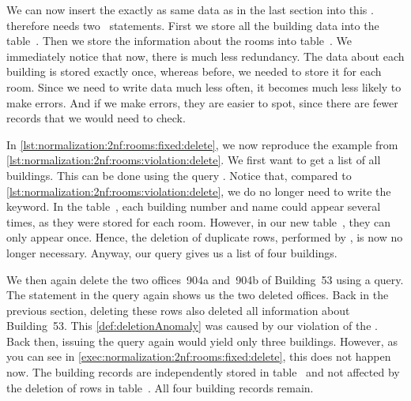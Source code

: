 We can now insert the exactly as same data as in the last section into this \db.
 therefore needs two~ statements.
First we store all the building data into the table~.
Then we store the information about the rooms into table~.
We immediately notice that now, there is much less redundancy.
The data about each building is stored exactly once, whereas before, we needed to store it for each room.
Since we need to write data much less often, it becomes much less likely to make errors.
And if we make errors, they are easier to spot, since there are fewer records that we would need to check.

In \cref{lst:normalization:2nf:rooms:fixed:delete}, we now reproduce the example from \cref{lst:normalization:2nf:rooms:violation:delete}.
We first want to get a list of all buildings.
This can be done using the query .
Notice that, compared to \cref{lst:normalization:2nf:rooms:violation:delete}, we do no longer need to write the  keyword.
In the table~, each building number and name could appear several times, as they were stored for each room.
However, in our new table~, they can only appear once.
Hence, the deletion of duplicate rows, performed by , is now no longer necessary.
Anyway, our query gives us a list of four buildings.

We then again delete the two offices~904a and~904b of Building~53 using a  query.
The  statement in the query again shows us the two deleted offices.
Back in the previous section, deleting these rows also deleted all information about Building~53.
This \cref{def:deletionAnomaly} was caused by our violation of the .
Back then, issuing the  query again would yield only three buildings.
However, as you can see in \cref{exec:normalization:2nf:rooms:fixed:delete}, this does not happen now.
The building records are independently stored in table~ and not affected by the deletion of rows in table~.
All four building records remain.

